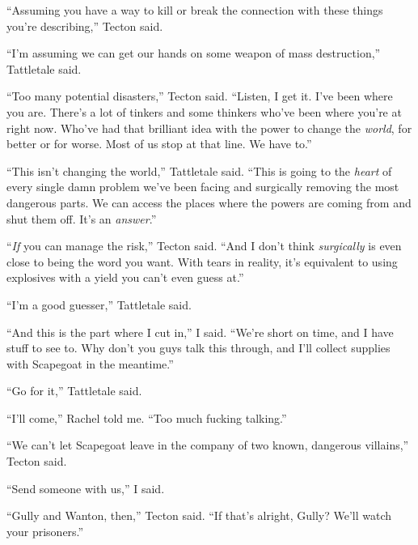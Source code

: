 ``Assuming you have a way to kill or break the connection with these things you're describing,'' Tecton said.



``I'm assuming we can get our hands on some weapon of mass destruction,'' Tattletale said.



``Too many potential disasters,'' Tecton said.  ``Listen, I get it.  I've been where you are.  There's a lot of tinkers and some thinkers who've been where you're at right now.  Who've had that brilliant idea with the power to change the \emph{world}, for better or for worse.  Most of us stop at that line.  We have to.''



``This isn't changing the world,'' Tattletale said.  ``This is going to the \emph{heart} of every single damn problem we've been facing and surgically removing the most dangerous parts.  We can access the places where the powers are coming from and shut them off.  It's an \emph{answer}.''



``\emph{If }you can manage the risk,'' Tecton said.  ``And I don't think \emph{surgically} is even close to being the word you want.  With tears in reality, it's equivalent to using explosives with a yield you can't even guess at.''



``I'm a good guesser,'' Tattletale said.



``And this is the part where I cut in,'' I said.  ``We're short on time, and I have stuff to see to.  Why don't you guys talk this through, and I'll collect supplies with Scapegoat in the meantime.''



``Go for it,'' Tattletale said.



``I'll come,'' Rachel told me.  ``Too much fucking talking.''



``We can't let Scapegoat leave in the company of two known, dangerous villains,'' Tecton said.



``Send someone with us,'' I said.



``Gully and Wanton, then,'' Tecton said.  ``If that's alright, Gully?  We'll watch your prisoners.''



